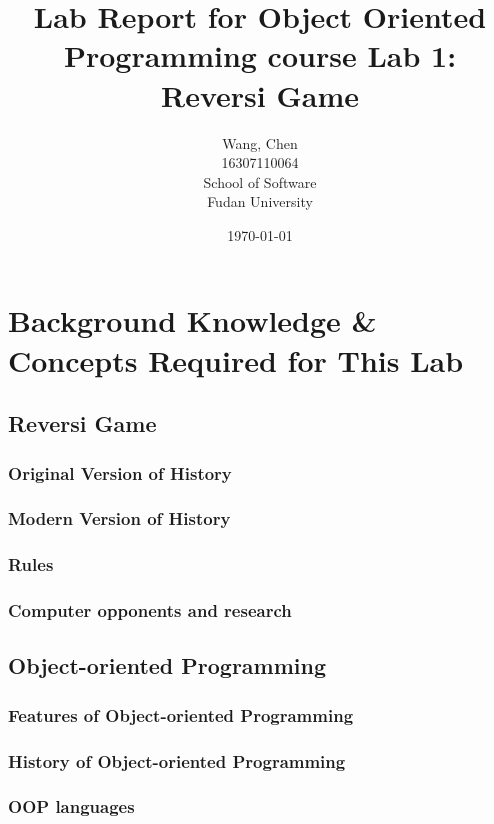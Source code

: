 \documentclass[a4paper]{report}
\title{Lab Report for Object Oriented Programming course \newline
 Lab 1: Reversi Game}
\author{Wang, Chen \\ 16307110064 \\ School of Software\\ Fudan University}
\date{\today}
\begin{document}
\maketitle

\tableofcontents

\chapter{Background Knowledge \& Concepts Required for This Lab}
\section{Reversi Game}
\subsection{Original Version of History}


\subsection{Modern Version of History}


\subsection{Rules}

\subsection{Computer opponents and research}




\section{Object-oriented Programming}
\subsection{Features of Object-oriented Programming}



\subsection{History of Object-oriented Programming}


\subsection{OOP languages}
\end{document}
